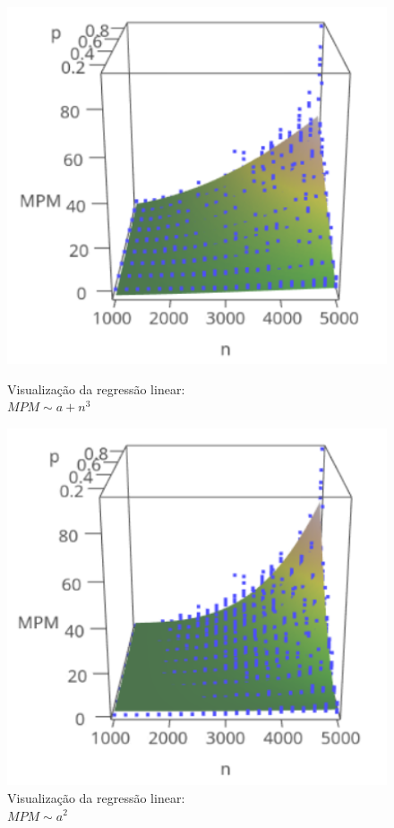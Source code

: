 \documentclass{uofa-eng-assignment}
\begin{document}
\begin{figure}[h]
    \centering
    \begin{minipage}{0.45\textwidth}
        \centering
        \includegraphics[width=1\textwidth]{mpm_a+n^3_plot_lm.png}
        \captionsetup{justification=centering}
        \caption{Visualização da regressão linear: \\$MPM \sim a + n^3$}
        \label{fig:plot3d-mpm}
    \end{minipage}
    \hfill
    \begin{minipage}{0.45\textwidth}
        \centering
        \includegraphics[width=1\textwidth]{mpm_a^2_plot_lm.png}
        \captionsetup{justification=centering}
        \caption{Visualização da regressão linear: \\$MPM \sim a^2$}
        \label{fig:plot3d-mpm-2}
    \end{minipage}
\end{figure}
\end{document}
